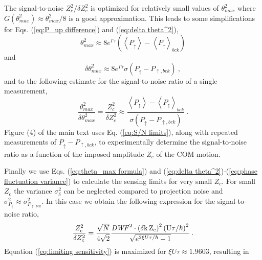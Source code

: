 \documentclass[aps,prl,onecolumn,superscriptaddress,floatfix]{revtex4-1}
\begin{document}
The signal-to-noise $Z_{c}^{2}/\delta Z_{c}^{2}$ is optimized
for relatively small values of $\theta_{max}^{2}$ where $G\left(\theta_{max}^{2}\right)\approx\theta_{max}^{2}/8$
is a good approximation. This leads to some simplifications for Eqs.
(\ref{eq:P_up difference}) and (\ref{eq:delta theta^2}),
\begin{equation}
\theta_{max}^{2}\approx8e^{\Gamma\tau}\left(\left\langle P_{\uparrow}\right\rangle -\left\langle P_{\uparrow}\right\rangle _{bck}\right)\label{eq:theta_max^sq}
\end{equation}
and
\begin{equation}
\delta\theta_{max}^{2}\approx8e^{\Gamma\tau}\sigma\left(P_{\uparrow} - P_{\uparrow,bck}\right)\:,\label{eq:delta theta_max^2}
\end{equation}
and to the following estimate for the signal-to-noise ratio of a single
measurement,
\begin{equation}
\frac{\theta_{max}^{2}}{\delta\theta_{max}^{2}} = \frac{Z_{c}^{2}}{\delta Z_{c}^{2}} \approx\frac{\left\langle P_{\uparrow}\right\rangle -\left\langle P_{\uparrow}\right\rangle _{bck}}{\sigma\left(P_{\uparrow} - P_{\uparrow,bck}\right)}\:.\label{eq:S/N limits}
\end{equation}
Figure (4) of the main text uses Eq. (\ref{eq:S/N limits}),
along with repeated measurements of $P_{\uparrow} - P_{\uparrow,bck}$,
to experimentally determine the signal-to-noise ratio as a function
of the imposed amplitude $Z_{c}$ of the COM motion.

Finally we use Eqs. (\ref{eq:theta_max formula}) and (\ref{eq:delta theta^2})-(\ref{eq:phase fluctuation variance})
to calculate the sensing limits for very small $Z_{c}$. For small
$Z_{c}$ the variance $\sigma_{\delta}^{2}$ can be neglected compared
to projection noise and $\sigma_{P_{\uparrow}}^2\approx\sigma_{P_{\uparrow, bck}}^2$.
In this case we obtain the following expression for the signal-to-noise
ratio,
\begin{equation}
\frac{Z_{c}^{2}}{\delta Z_{c}^{2}}=\frac{\sqrt{N}}{4\sqrt{2}}\frac{\rm{\it{DWF}}^{2}\cdot\left(\delta k\,Z_{c}\right)^{2}\left(U\tau/\hbar\right)^{2}}{\sqrt{e^{2\xi U\tau/\hbar}-1}}\:.\label{eq:limiting sensitivity}
\end{equation}
Equation (\ref{eq:limiting sensitivity}) is maximized for $\xi U\tau\approx1.9603$, resulting in 
\end{document}
